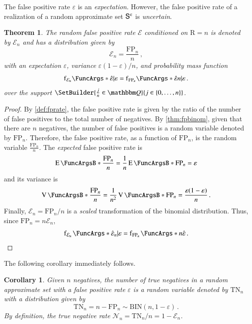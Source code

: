 \documentclass[10pt,final,hidelinks]{article}
\numberwithin{equation}{section}
\providecommand{\Given}{\vert}
\newcommand{\TNR}{\mathcal{N}}
\newcommand{\FPR}{\mathcal{E}}
\newcommand{\FP}{\RV{FP}}
\newcommand{\TN}{\RV{TN}}
\newcommand{\fprate}{\varepsilon}
\newcommand{\fprateob}{\hat{\fprate}}
\newcommand{\RV}[1]{\mathrm{#1}}
\newcommand{\Pdf}{\operatorname{f}}
\newcommand{\bindist}{\mathrm{BIN}}
\newcommand{\envnumstyle}{chapter}
\renewcommand{\envnumstyle}{chapter}
\renewcommand{\envnumstyle}{section}
\theoremstyle{plain}
\newtheorem{theorem}{Theorem}[\envnumstyle]
\newtheorem{corollary}{Corollary}[theorem]
\begin{document}
The false positive rate $\fprate$ is an \emph{expectation}.
However, the false positive rate of a realization of a random approximate set $\ASet{S}[\fprate]$ is \emph{uncertain}.
\begin{theorem}
\label{thm:fpr}
The random false positive rate $\FPR$ conditioned on $\RV{R} = n$ is denoted by $\FPR_n$ and has a distribution given by
\begin{equation}
    \FPR_n = \frac{\FP_n}{n}\,,
\end{equation}
with an expectation $\fprate$, variance $\fprate(1-\fprate) / n$, and probability mass function
\begin{equation}
	\Pdf_{\FPR_n}\!\FuncArgs*{\fprateob \Given \fprate} = \Pdf_{\FP_n}\!\FuncArgs*{\fprateob n \Given \fprate}\,.
\end{equation}
over the support $\SetBuilder{ \frac{j}{n} \in \BlackboardSet{Q}}{j \in \{0,\ldots,n\}}$.
\end{theorem}
\begin{proof}
By \cref{def:fprate}, the false positive rate is given by the ratio of the number of false positives to the total number of negatives.
By \cref{thm:fpbinom}, given that there are $n$ negatives, the number of false positives is a random variable denoted by $\FP_n$.
Therefore, the false positive rate, as a function of $\FP_n$, is the random variable $\frac{\FP_n}{n}$.
The \emph{expected} false positive rate is
\begin{equation}
    \Expect{\frac{\FP_n}{n}} = \frac{1}{n}\Expect{\FP_n} = \fprate
\end{equation}
and its variance is
\begin{equation}
    \Var{\frac{\FP_n}{n}} = \frac{1}{n^2}\Var{\FP_n} = \frac{\fprate(1-\fprate)}{n}\,.
\end{equation}
Finally, $\FPR_n = \FP_n / n$ is a \emph{scaled} transformation of the binomial distribution.
Thus, since $\FP_n = n \FPR_n$,
\begin{equation}
	\PDF{\fprateob_n \Given \fprate}[\FPR_n] = \PDF{n \fprateob}[\FP_n]\,.
\end{equation}
\end{proof}
The following corollary immediately follows.
\begin{corollary}
	\label{cor:tnbinom}
	Given $n$ negatives, the number of \emph{true negatives} in a random approximate set with a false positive rate $\fprate$ is a random variable denoted by $\TN_n$ with a distribution given by
	\begin{equation}
	\TN_n = n - \FP_n \sim \bindist\!\left(n, 1-\fprate\right)\,.
	\end{equation}
	By definition, the \emph{true negative rate} $\TNR_n = \TN_n / n = 1 - \FPR_n$.
\end{corollary}
\end{document}
